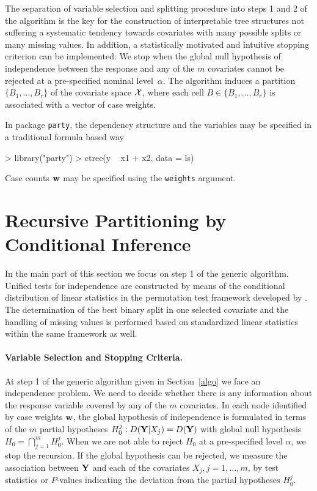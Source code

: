 \documentclass[letter]{article}
\begin{document}
The separation of variable
selection and splitting procedure into steps 1 and 2 of the algorithm
is the key for the construction of interpretable tree
structures not suffering a systematic tendency towards covariates with many
possible splits or many missing values. In addition, a statistically
motivated and intuitive stopping criterion can be implemented: We stop 
when the global null hypothesis of independence between the
response and any of the $m$ covariates cannot be rejected at a pre-specified
nominal level~$\alpha$. The algorithm induces a partition $\{B_1, \dots, B_r\}$ of
the covariate space $\mathcal{X}$, where each cell $B \in \{B_1, \dots, B_r\}$ 
is associated with a vector of case weights. 

In package \texttt{party}, the dependency structure and the variables may be
specified in a traditional formula based way
\begin{Schunk}
\begin{Sinput}
> library("party")
> ctree(y ~ x1 + x2, data = ls)
\end{Sinput}
\end{Schunk}
Case counts $\mathbf{w}$ may be specified using the \texttt{weights} argument.

\section{Recursive Partitioning by Conditional Inference \label{framework}}

In the main part of this section we focus on step 1 of the generic algorithm.
Unified tests for independence are constructed by means of the conditional
distribution of linear statistics in the permutation test framework
developed by \cite{StrasserWeber1999}. The determination of the best binary split
in one selected covariate and the handling of missing values
is performed based on standardized linear statistics within the same
framework as well. 

\paragraph{Variable Selection and Stopping Criteria.}
At step 1 of the generic algorithm given in Section~\ref{algo} we face an 
independence problem. We need to decide whether there is any information
about the response variable covered by any of the $m$  covariates. In each node
identified by case weights $\mathbf{w}$, the
global hypothesis of independence is formulated in terms of the $m$ partial hypotheses
$H_0^j: D(\mathbf{Y} | X_j) = D(\mathbf{Y})$ with global null hypothesis $H_0 = \bigcap_{j = 1}^m
H_0^j$.
When we are not able to reject $H_0$ at a pre-specified 
level $\alpha$, we stop the recursion.
If the global hypothesis can be rejected, we measure the association
between $\mathbf{Y}$ and each of the covariates $X_j, j = 1, \dots, m$, by
test statistics or $P$-values indicating the deviation from the partial
hypotheses $H_0^j$.  
\end{document}
